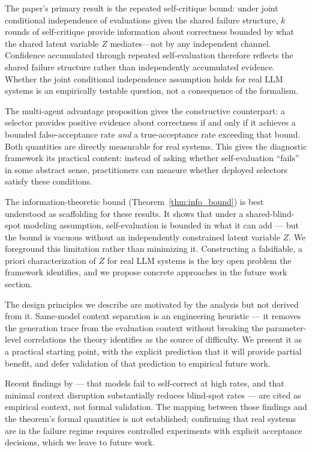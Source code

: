 \documentclass[11pt]{article}
\begin{document}
The paper's primary result is the repeated self-critique bound: under joint conditional
independence of evaluations given the shared failure structure, $k$ rounds of self-critique
provide information about correctness bounded by what the shared latent variable $Z$
mediates---not by any independent channel. Confidence accumulated through repeated
self-evaluation therefore reflects the shared failure structure rather than independently
accumulated evidence. Whether the joint conditional independence assumption holds for real
LLM systems is an empirically testable question, not a consequence of the formalism.

The multi-agent advantage proposition gives the constructive counterpart: a selector
provides positive evidence about correctness if and only if it achieves a bounded
false-acceptance rate \emph{and} a true-acceptance rate exceeding that bound. Both
quantities are directly measurable for real systems. This gives the diagnostic framework
its practical content: instead of asking whether self-evaluation ``fails'' in some abstract
sense, practitioners can measure whether deployed selectors satisfy these conditions.

The information-theoretic bound (Theorem~\ref{thm:info_bound}) is best understood as
scaffolding for these results. It shows that under a shared-blind-spot modeling assumption,
self-evaluation is bounded in what it can add --- but the bound is vacuous without an
independently constrained latent variable $Z$. We foreground this limitation rather than
minimizing it. Constructing a falsifiable, a priori characterization of $Z$ for real LLM
systems is the key open problem the framework identifies, and we propose concrete approaches
in the future work section.

The design principles we describe are motivated by the analysis but not derived from it.
Same-model context separation is an engineering heuristic --- it removes the generation
trace from the evaluation context without breaking the parameter-level correlations the
theory identifies as the source of difficulty. We present it as a practical starting point,
with the explicit prediction that it will provide partial benefit, and defer validation of
that prediction to empirical future work.

Recent findings by \citet{tsui2025selfcorrection} --- that models fail to self-correct
at high rates, and that minimal context disruption substantially reduces blind-spot rates
--- are cited as empirical context, not formal validation. The mapping between those
findings and the theorem's formal quantities is not established; confirming that real
systems are in the failure regime requires controlled experiments with explicit acceptance
decisions, which we leave to future work.
\end{document}
